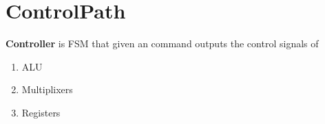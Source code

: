 \chapter{ControlPath}
\textbf{Controller} is FSM that given an command outputs the control signals of
\begin{enumerate}
    \item ALU
    \item Multiplixers
    \item Registers
\end{enumerate}